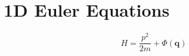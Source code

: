 \documentclass{article}
\begin{document}
\section*{1D Euler Equations}



\begin{equation}
    H = \frac{p^2}{2m} + \Phi(\mathbf{q})
\end{equation}
\end{document}
